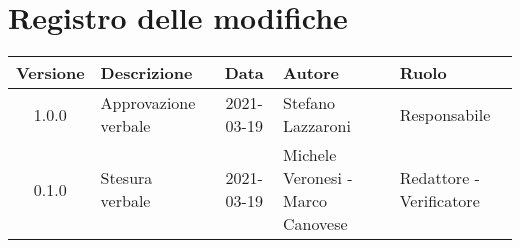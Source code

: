 \section*{Registro delle modifiche}

\begin{center}
	\begin{longtable}{|c|p{4cm}|c|p{3cm}|p{3cm}|}
		\hline
		\rowcolor{lighter-grayer}
		\textbf{Versione} & \textbf{Descrizione} & \textbf{Data} & \textbf{Autore} & \textbf{Ruolo} \\
		\hline
		\endfirsthead

		\hline
		1.0.0 & Approvazione verbale & 2021-03-19 & Stefano Lazzaroni & Responsabile \\
		0.1.0 & Stesura verbale & 2021-03-19 & Michele Veronesi - Marco Canovese & Redattore - Verificatore \\
		\hline
	\end{longtable}
\end{center}